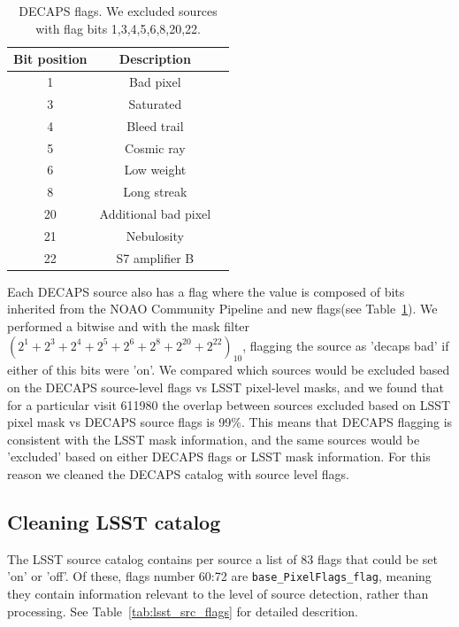 \documentclass[DM,lsstdraft,toc,usenatbib]{lsstdoc}
\begin{document}

\begin{table}
\centering
\caption{DECAPS flags. We excluded sources with flag bits 1,3,4,5,6,8,20,22.}
\label{tab:decaps_flags}
\begin{tabular}{ ccc} 
\hline
Bit position & Description \\ 
\hline
1  &     Bad pixel            \\ 
3  &    Saturated      \\ 
4  &    Bleed trail      \\ 
5  &    Cosmic ray       \\ 
6  &    Low weight      \\ 
8  &    Long streak      \\ 
20  &   Additional bad pixel    \\ 
21 &    Nebulosity     \\ 
22  &   S7 amplifier B        \\ 
\hline
\end{tabular}
\end{table}


Each DECAPS source  also has a flag where the value is composed of bits inherited from the NOAO Community Pipeline and new flags(see Table~\ref{tab:decaps_flags}). We performed a bitwise and with the mask filter $(2^{1}+ 2^{3}+  2^{4}+  2^{5}+  2^{6}+  2^{8}+  2^{20}+  2^{22})_{10}$, flagging the source as 'decaps bad' if either of this bits were 'on'. We compared which sources would be excluded based on the DECAPS source-level flags vs LSST pixel-level masks, and we found that for a particular visit 611980 the overlap between sources excluded based on LSST pixel mask vs DECAPS source flags is 99\%. This means that DECAPS flagging is consistent with the LSST mask information, and the same sources would be 'excluded' based on either DECAPS flags or LSST mask information. 
For this reason we cleaned the DECAPS catalog with  source level flags. 
 
\subsection{Cleaning LSST catalog}
\label{sec:clean_lsst}
The LSST source catalog contains per source a list of 83 flags that could be set 'on' or 'off'. Of these, flags number 60:72 are \verb|base_PixelFlags_flag|, meaning they contain information relevant to the level of source detection, rather than processing. See Table~\ref{tab:lsst_src_flags} for detailed descrition. 
\end{document}
